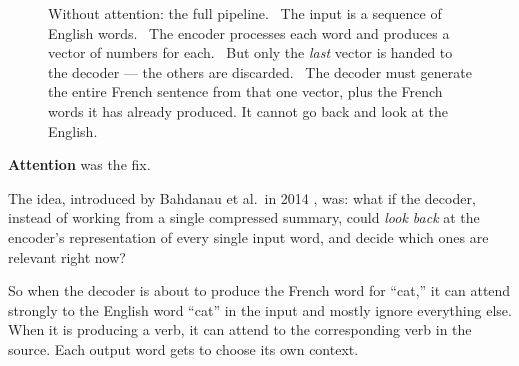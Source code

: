 \begin{figure}[htb]
\caption{Without attention: the full pipeline. ~The input is a sequence of English words. ~The encoder processes each word and produces a vector of numbers for each. ~But only the \emph{last} vector is handed to the decoder --- the others are discarded. ~The decoder must generate the entire French sentence from that one vector, plus the French words it has already produced. It cannot go back and look at the English.}
\end{figure}

\textbf{Attention} was the fix.

The idea, introduced by Bahdanau et al.\ in 2014 \cite{bahdanau2014neural}, was: what if the decoder, instead of working from a single compressed summary, could \emph{look back} at the encoder's representation of every single input word, and decide which ones are relevant right now?

So when the decoder is about to produce the French word for ``cat,'' it can attend strongly to the English word ``cat'' in the input and mostly ignore everything else.
When it is producing a verb, it can attend to the corresponding verb in the source.
Each output word gets to choose its own context.

